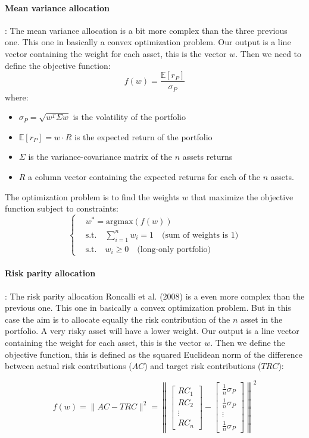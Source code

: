 \documentclass{article}
\begin{document}
\paragraph{Mean variance allocation} : The mean variance allocation is a bit more complex than the three previous one. This one in basically a convex optimization problem. Our output is a line vector containing the weight for each asset, this is the vector $w$. Then we need to define the objective function: $$f(w)=\frac{\mathbb{E}[r_P]}{\sigma_P}$$
where:
\begin{itemize}
    \item $\sigma_P=\sqrt{w^T \Sigma w}$ is the volatility of the portfolio
    \item $\mathbb{E}[r_P]=w \cdot R$ is the expected return of the portfolio
    \item $\Sigma$ is the variance-covariance matrix of the $n$ assets returns
    \item $R$ a column vector containing the expected returns for each of the $n$ assets.
\end{itemize}
The optimization problem is to find the weights $w$ that maximize the objective function subject to constraints:
\[
\begin{cases}
\textbf{} & w^*=\text{argmax}(f(w)) \\
 \text{}& \text{s.t.} \quad\sum_{i=1}^{n} w_i = 1 \quad \text{(sum of weights is 1)} \\
 \text{} & \text{s.t.} \quad w_i \geq 0 \quad \text{(long-only portfolio)}
\end{cases}
\]
\newline
\paragraph{Risk parity allocation} : The risk parity allocation Roncalli et al. (2008)\cite{Maillard2008} is a even more complex than the previous one. This one in basically a convex optimization problem. But in this case the aim is to allocate equally the risk contribution of the $n$ asset in the portfolio. A very risky asset will have a lower weight. Our output is a line vector containing the weight for each asset, this is the vector $w$. Then we define the objective function, this is defined as the squared Euclidean norm of the difference between actual risk contributions (\(AC\)) and target risk contributions (\(TRC\)):

$$f(w) = \lVert AC - TRC \rVert^2=\left\lVert \begin{bmatrix} RC_1 \\ RC_2 \\ \vdots \\ RC_n \end{bmatrix} - \begin{bmatrix} \frac{1}{n} \sigma_P \\ \frac{1}{n} \sigma_P \\ \vdots \\ \frac{1}{n} \sigma_P \end{bmatrix} \right\rVert^2$$
\end{document}
